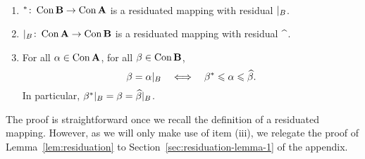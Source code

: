 \begin{lemma}\
\label{lem:residuation}
\begin{enumerate}[\rm(i)]
  \item \label{item:residlemma-i} $^*\colon \operatorname{Con}\mathbf{B} \rightarrow \operatorname{Con}\mathbf{A}$ is a residuated mapping with
    residual $|_B$.
  \item \label{item:residlemma-ii} $|_B \colon  \operatorname{Con}\mathbf{A} \rightarrow \operatorname{Con}\mathbf{B}$ is a residuated mapping with
    residual $\hatmap$.
\item \label{item:residlemma-iii} For all $\alpha \in \operatorname{Con}\mathbf{A}$, for all $\beta \in \operatorname{Con}\mathbf{B}$,
\[
\beta = \alpha|_B \quad \Longleftrightarrow  \quad
\beta^* \leqslant \alpha \leqslant \widehat{\beta}.
\]
In particular,
$\beta^*|_B = \beta = \widehat{\beta}|_B$.
  \end{enumerate}
\end{lemma}
The proof is straightforward once we recall the definition of a residuated mapping.
However, as we will only make use of item (iii), we relegate the proof of 
Lemma~\ref{lem:residuation} to Section~\ref{sec:residuation-lemma-1} of the appendix.

